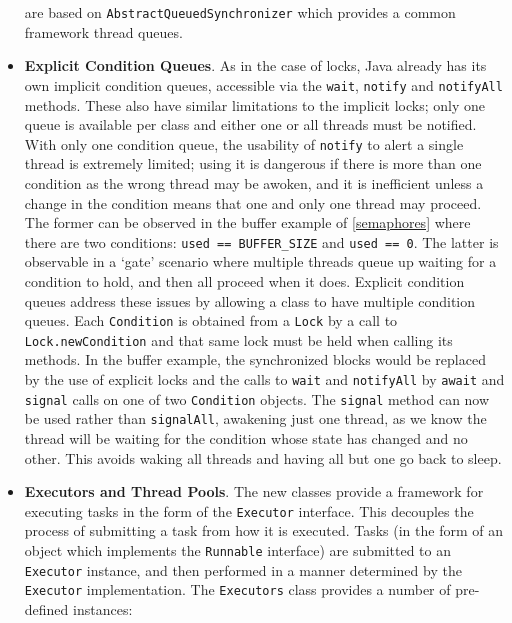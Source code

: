 \begin{itemize}
    are based on \texttt{AbstractQueuedSynchronizer}\cite{aqs} which
    provides a common framework thread queues.
    \item \textbf{Explicit Condition Queues}.  As in the case of
      locks, Java already has its own implicit condition queues,
      accessible via the \texttt{wait}, \texttt{notify} and
      \texttt{notifyAll} methods.  These also have similar limitations
      to the implicit locks; only one queue is available per class and
      either one or all threads must be notified.  With only one
      condition queue, the usability of \texttt{notify} to alert a
      single thread is extremely limited; using it is dangerous if
      there is more than one condition as the wrong thread may be
      awoken, and it is inefficient unless a change in the condition
      means that one and only one thread may proceed.  The former can
      be observed in the buffer example of \ref{semaphores} where
      there are two conditions: \texttt{used == BUFFER_SIZE} and
      \texttt{used == 0}. The latter is observable in a `gate'
      scenario where multiple threads queue up waiting for a condition
      to hold, and then all proceed when it does.  Explicit condition
      queues address these issues by allowing a class to have multiple
      condition queues.  Each \texttt{Condition} is obtained from a
      \texttt{Lock} by a call to \texttt{Lock.newCondition} and that
      same lock must be held when calling its methods.  In the buffer
      example, the synchronized blocks would be replaced by the use of
      explicit locks and the calls to \texttt{wait} and
      \texttt{notifyAll} by \texttt{await} and \texttt{signal} calls
      on one of two \texttt{Condition} objects.  The \texttt{signal}
      method can now be used rather than \texttt{signalAll}, awakening
      just one thread, as we know the thread will be waiting for the
      condition whose state has changed and no other.  This avoids
      waking all threads and having all but one go back to sleep.
    \item \textbf{Executors and Thread Pools}.  The new classes
      provide a framework for executing tasks in the form of the
      \texttt{Executor} interface.  This decouples the process of
      submitting a task from how it is executed.  Tasks (in the form of an object which implements the \texttt{Runnable} interface) are submitted to an \texttt{Executor} instance, and then performed in a manner determined by the \texttt{Executor} implementation.  The \texttt{Executors} class provides a number of pre-defined instances:

\end{itemize}
